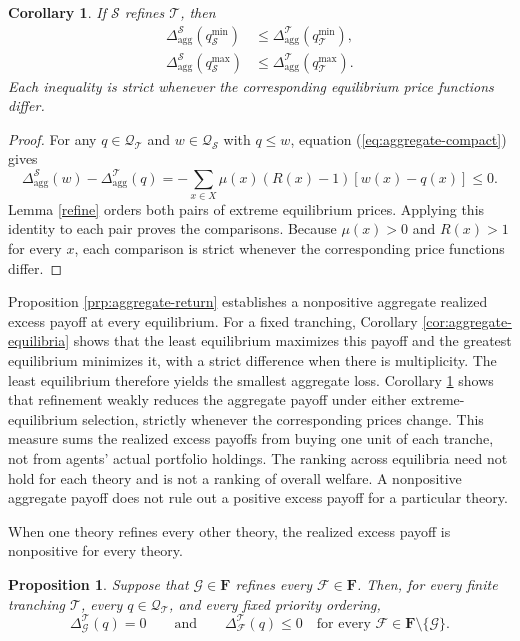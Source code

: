 \documentclass[11pt]{article}
\theoremstyle{plain}
\newtheorem{prp}{Proposition}%
\newtheorem{crl}{Corollary}%
\begin{document}
\begin{crl}\label{cor:aggregate-refinement}
If $\mathcal{S}$ refines $\mathcal{T}$, then
\[
\begin{aligned}
\Delta_{\mathrm{agg}}^{\mathcal{S}}(q_{\mathcal{S}}^{\min})
&\leq
\Delta_{\mathrm{agg}}^{\mathcal{T}}(q_{\mathcal{T}}^{\min}),\\
\Delta_{\mathrm{agg}}^{\mathcal{S}}(q_{\mathcal{S}}^{\max})
&\leq
\Delta_{\mathrm{agg}}^{\mathcal{T}}(q_{\mathcal{T}}^{\max}).
\end{aligned}
\]
Each inequality is strict whenever the corresponding equilibrium price functions differ.
\end{crl}

\begin{proof}
For any $q\in\mathcal{Q}_{\mathcal{T}}$ and $w\in\mathcal{Q}_{\mathcal{S}}$ with $q\leq w$, equation (\ref{eq:aggregate-compact}) gives
\[
\Delta_{\mathrm{agg}}^{\mathcal{S}}(w)
-\Delta_{\mathrm{agg}}^{\mathcal{T}}(q)
=-
\sum_{x\in X}\mu(x)(R(x)-1)\left[w(x)-q(x)\right]
\leq0.
\]
Lemma \ref{refine} orders both pairs of extreme equilibrium prices. Applying this identity to each pair proves the comparisons. Because $\mu(x)>0$ and $R(x)>1$ for every $x$, each comparison is strict whenever the corresponding price functions differ.
\end{proof}

Proposition \ref{prp:aggregate-return} establishes a nonpositive aggregate realized excess payoff at every equilibrium. For a fixed tranching, Corollary \ref{cor:aggregate-equilibria} shows that the least equilibrium maximizes this payoff and the greatest equilibrium minimizes it, with a strict difference when there is multiplicity. The least equilibrium therefore yields the smallest aggregate loss. Corollary \ref{cor:aggregate-refinement} shows that refinement weakly reduces the aggregate payoff under either extreme-equilibrium selection, strictly whenever the corresponding prices change. This measure sums the realized excess payoffs from buying one unit of each tranche, not from agents' actual portfolio holdings. The ranking across equilibria need not hold for each theory and is not a ranking of overall welfare. A nonpositive aggregate payoff does not rule out a positive excess payoff for a particular theory.

When one theory refines every other theory, the realized excess payoff is nonpositive for every theory.

\begin{prp}\label{prp:finest-return}
Suppose that $\mathcal{G}\in\mathbf{F}$ refines every $\mathcal{F}\in\mathbf{F}$. Then, for every finite tranching $\mathcal{T}$, every $q\in\mathcal{Q}_{\mathcal{T}}$, and every fixed priority ordering,
\[
\Delta_\mathcal{G}^{\mathcal{T}}(q)=0
\qquad\text{and}\qquad
\Delta_\mathcal{F}^{\mathcal{T}}(q)\leq0
\quad
\text{for every }\mathcal{F}\in\mathbf{F}\setminus\{\mathcal{G}\}.
\]
\end{prp}
\end{document}
